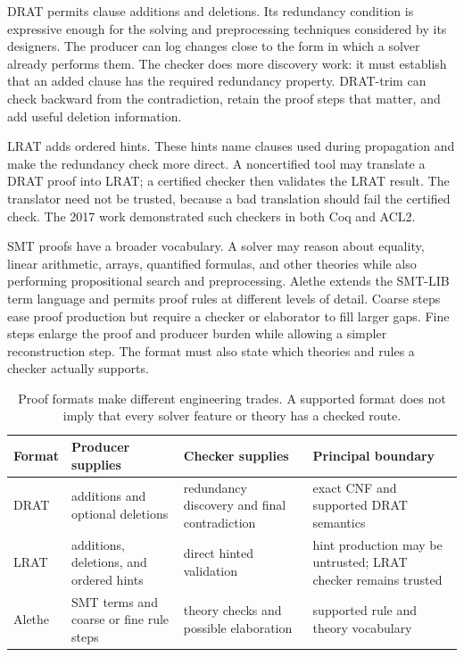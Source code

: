 DRAT permits clause additions and deletions. Its redundancy condition is
expressive enough for the solving and preprocessing techniques considered by
its designers. The producer can log changes close to the form in which a
solver already performs them. The checker does more discovery work: it must
establish that an added clause has the required redundancy property.
DRAT-trim can check backward from the contradiction, retain the proof steps
that matter, and add useful deletion information.\autocite{wetzler2014drat}

LRAT adds ordered hints. These hints name clauses used during propagation and
make the redundancy check more direct. A noncertified tool may translate a
DRAT proof into LRAT; a certified checker then validates the LRAT result. The
translator need not be trusted, because a bad translation should fail the
certified check. The 2017 work demonstrated such checkers in both Coq and
ACL2.\autocite{cruzfilipe2017lrat}

SMT proofs have a broader vocabulary. A solver may reason about equality,
linear arithmetic, arrays, quantified formulas, and other theories while also
performing propositional search and preprocessing. Alethe extends the SMT-LIB
term language and permits proof rules at different levels of detail. Coarse
steps ease proof production but require a checker or elaborator to fill larger
gaps. Fine steps enlarge the proof and producer burden while allowing a
simpler reconstruction step. The format must also state which theories and
rules a checker actually supports.\autocite{schurr2021alethe}

\begin{table}[htbp]
\centering
\caption{Proof formats make different engineering trades. A supported format
does not imply that every solver feature or theory has a checked route.}
\begin{tabular}{@{}p{}p{}p{}p{}@{}}
\toprule
Format & Producer supplies & Checker supplies & Principal boundary \\
\midrule
DRAT & additions and optional deletions & redundancy discovery and final contradiction & exact CNF and supported DRAT semantics \\
LRAT & additions, deletions, and ordered hints & direct hinted validation & hint production may be untrusted; LRAT checker remains trusted \\
Alethe & SMT terms and coarse or fine rule steps & theory checks and possible elaboration & supported rule and theory vocabulary \\
\bottomrule
\end{tabular}
\label{tab:proof-format-tradeoffs}
\end{table}


